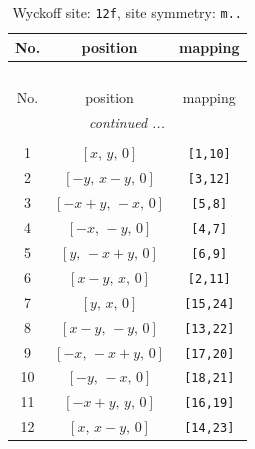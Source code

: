 \documentclass[fleqn,8pt]{jsarticle}
\begin{document}
\begin{longtable}{ccc}
\caption{Wyckoff site: {\tt 12f}, site symmetry: {\tt m..}}
 \\
 \hline \hline
No. & position & mapping \\ \hline \endfirsthead

\multicolumn{2}{l}{\tablename\ \thetable{}} \\
 \hline \hline
No. & position & mapping \\ \hline \endhead

 \hline \hline
\multicolumn{2}{r}{\footnotesize\it continued ...} \\ \endfoot

 \hline \hline
\multicolumn{2}{r}{} \\ \endlastfoot

1 & $\left[ x,\, y,\, 0 \right]$ & {\tt [1,10]} \\ \hline
2 & $\left[ - y,\, x - y,\, 0 \right]$ & {\tt [3,12]} \\ \hline
3 & $\left[ - x + y,\, - x,\, 0 \right]$ & {\tt [5,8]} \\ \hline
4 & $\left[ - x,\, - y,\, 0 \right]$ & {\tt [4,7]} \\ \hline
5 & $\left[ y,\, - x + y,\, 0 \right]$ & {\tt [6,9]} \\ \hline
6 & $\left[ x - y,\, x,\, 0 \right]$ & {\tt [2,11]} \\ \hline
7 & $\left[ y,\, x,\, 0 \right]$ & {\tt [15,24]} \\ \hline
8 & $\left[ x - y,\, - y,\, 0 \right]$ & {\tt [13,22]} \\ \hline
9 & $\left[ - x,\, - x + y,\, 0 \right]$ & {\tt [17,20]} \\ \hline
10 & $\left[ - y,\, - x,\, 0 \right]$ & {\tt [18,21]} \\ \hline
11 & $\left[ - x + y,\, y,\, 0 \right]$ & {\tt [16,19]} \\ \hline
12 & $\left[ x,\, x - y,\, 0 \right]$ & {\tt [14,23]} \\
\end{longtable}
\renewcommand{\arraystretch}{1.2}
\end{document}
